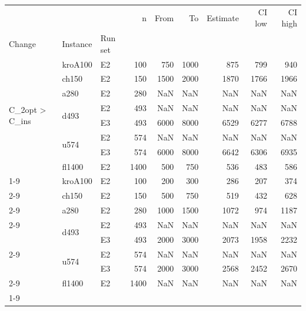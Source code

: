 \begin{tabular}{lllrrrrrr}
\toprule
 &  &  & n & From & To & Estimate & CI low & CI high \\
Change & Instance & Run set &  &  &  &  &  &  \\
\midrule
\multirow[t]{8}{*}{C\_2opt > C\_ins} & kroA100 & E2 & 100 & 750 & 1000 & 875 & 799 & 940 \\
\cline{2-9}
 & ch150 & E2 & 150 & 1500 & 2000 & 1870 & 1766 & 1966 \\
\cline{2-9}
 & a280 & E2 & 280 & NaN & NaN & NaN & NaN & NaN \\
\cline{2-9}
 & \multirow[t]{2}{*}{d493} & E2 & 493 & NaN & NaN & NaN & NaN & NaN \\
 &  & E3 & 493 & 6000 & 8000 & 6529 & 6277 & 6788 \\
\cline{2-9}
 & \multirow[t]{2}{*}{u574} & E2 & 574 & NaN & NaN & NaN & NaN & NaN \\
 &  & E3 & 574 & 6000 & 8000 & 6642 & 6306 & 6935 \\
\cline{2-9}
 & fl1400 & E2 & 1400 & 500 & 750 & 536 & 483 & 586 \\
\cline{1-9} \cline{2-9}
\multirow[t]{8}{*}{C\_ins > C\_swap} & kroA100 & E2 & 100 & 200 & 300 & 286 & 207 & 374 \\
\cline{2-9}
 & ch150 & E2 & 150 & 500 & 750 & 519 & 432 & 628 \\
\cline{2-9}
 & a280 & E2 & 280 & 1000 & 1500 & 1072 & 974 & 1187 \\
\cline{2-9}
 & \multirow[t]{2}{*}{d493} & E2 & 493 & NaN & NaN & NaN & NaN & NaN \\
 &  & E3 & 493 & 2000 & 3000 & 2073 & 1958 & 2232 \\
\cline{2-9}
 & \multirow[t]{2}{*}{u574} & E2 & 574 & NaN & NaN & NaN & NaN & NaN \\
 &  & E3 & 574 & 2000 & 3000 & 2568 & 2452 & 2670 \\
\cline{2-9}
 & fl1400 & E2 & 1400 & NaN & NaN & NaN & NaN & NaN \\
\cline{1-9} \cline{2-9}
\bottomrule
\end{tabular}
